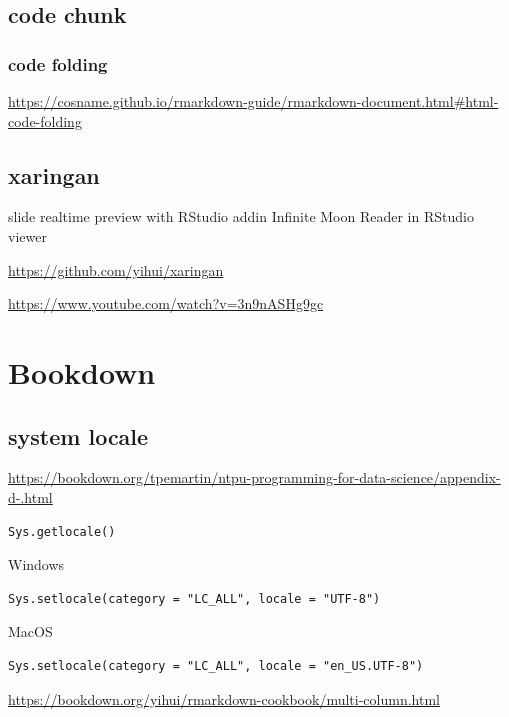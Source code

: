 \documentclass[
]{book}
\theoremstyle{definition}
\theoremstyle{definition}
\theoremstyle{definition}
\theoremstyle{definition}
\theoremstyle{remark}
\begin{document}
\hypertarget{code-chunk}{%
\subsection{code chunk}\label{code-chunk}}

\hypertarget{code-folding}{%
\subsubsection{code folding}\label{code-folding}}

\url{https://cosname.github.io/rmarkdown-guide/rmarkdown-document.html\#html-code-folding}

\hypertarget{xaringan}{%
\subsection{xaringan}\label{xaringan}}

slide realtime preview with RStudio addin Infinite Moon Reader in RStudio viewer

\url{https://github.com/yihui/xaringan}

\url{https://www.youtube.com/watch?v=3n9nASHg9gc}

\hypertarget{bookdown}{%
\section{Bookdown}\label{bookdown}}

\hypertarget{system-locale}{%
\subsection{system locale}\label{system-locale}}

\url{https://bookdown.org/tpemartin/ntpu-programming-for-data-science/appendix-d-.html}

\begin{verbatim}
Sys.getlocale()
\end{verbatim}

Windows

\begin{verbatim}
Sys.setlocale(category = "LC_ALL", locale = "UTF-8")
\end{verbatim}

MacOS

\begin{verbatim}
Sys.setlocale(category = "LC_ALL", locale = "en_US.UTF-8")
\end{verbatim}

\url{https://bookdown.org/yihui/rmarkdown-cookbook/multi-column.html}
\end{document}
